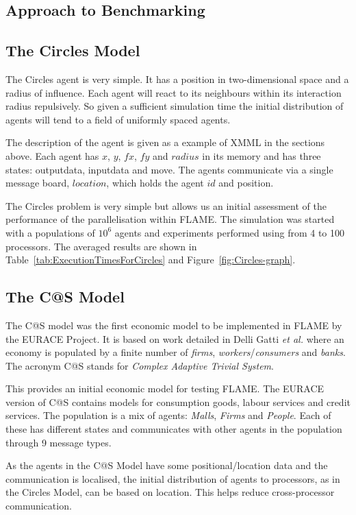 \subsection{Approach to Benchmarking}
\subsection{The Circles Model}
The Circles agent is very simple. It has a position in two-dimensional space and a radius of influence. Each agent will react to its neighbours within its interaction radius repulsively. So given a sufficient simulation time the initial distribution of agents will tend to a field of uniformly spaced agents.

The description of the agent is given as a example of XMML in the sections above. Each agent has $x$, $y$, $fx$, $fy$ and $radius$ in its memory and has three states: outputdata, inputdata and move. The agents communicate via a single message board, $location$, which holds the agent $id$ and position.

The Circles problem is very simple but allows us an initial assessment of the performance of the parallelisation within FLAME. The simulation was started with a populations of $10^6$  agents and experiments performed using from 4 to 100 processors. The averaged results are shown in Table~\ref{tab:ExecutionTimesForCircles} and Figure~\ref{fig:Circles-graph}.
\subsection{The C@S Model}
The C@S model was the first economic model to be implemented in FLAME by the EURACE Project.  It is based on work detailed in Delli Gatti \textsl{et al.} \cite{Delli Gatti} where an economy is populated by a finite number of \textsl{firms}, \textsl{workers}/\textsl{consumers} and \textsl{banks}. The acronym C@S stands for \textsl{Complex Adaptive Trivial System}.

This provides an initial economic model for testing FLAME. The EURACE version of C@S contains models for consumption goods, labour services and credit services. The population is a mix of agents: \textsl{Malls}, \textsl{Firms} and \textsl{People}. Each of these has different states and communicates with other agents in the population through 9 message types.

As the agents in the C@S Model have some positional/location data and the communication is localised, the initial distribution of agents to processors, as in the Circles Model, can be based on location. This helps reduce cross-processor communication.

